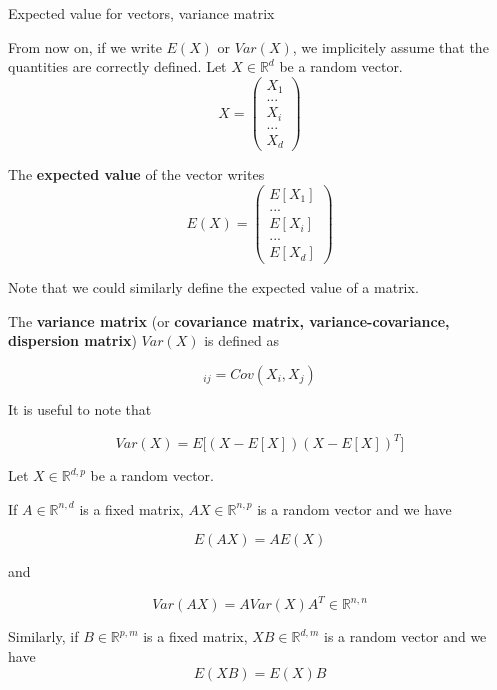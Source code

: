 \documentclass[
10pt, %
a4paper, %
oneside, %
headinclude,footinclude, %
BCOR5mm, %
]{scrartcl}
\begin{document}
\begin{definition}{Expected value for vectors, variance matrix}

    From now on, if we write $E(X)$ or $Var(X)$, we implicitely assume that the quantities are correctly defined. Let $X\in \mathbb{R}^d$ be a random vector.
\begin{equation*}
X=\begin{pmatrix}
X_{1}\\
...\\
X_{i}\\
...\\
X_{d}
\end{pmatrix}
\end{equation*}

The \textbf{{expected value}} of the vector writes
\begin{equation*}
    E(X)=\begin{pmatrix}
    E[X_{1}]\\
...\\
    E[X_{i}]\\
...\\
    E[X_{d}]
\end{pmatrix}
\end{equation*}

Note that we could similarly define the expected value of a matrix.

    The \textbf{{variance matrix}} (or \textbf{{covariance matrix, variance-covariance, dispersion matrix}})  $Var(X)$ is defined as

    \begin{equation*}
	[Var(X)]_{ij} = Cov(X_i, X_j)       
    \end{equation*}
\end{definition}

\begin{remark}
    It is useful to note that

    \begin{equation}
	Var(X) = E\Big[ (X-E[X])(X-E[X])^T\Big]
    \end{equation}
\end{remark}

\begin{lemma}
    Let $X \in \mathbb{R}^{d, p}$ be a random vector.

    If $A\in \mathbb{R}^{n,d}$ is a fixed matrix, $AX\in \mathbb{R}^{n,p}$ is a random vector and we have

    \begin{equation*}
	E(AX)=AE(X)
    \end{equation*}

    and 

        \begin{equation*}
	Var(AX) = AVar(X)A^T\in \mathbb{R}^{n, n}
    \end{equation*}
    
    Similarly, if $B\in \mathbb{R}^{p, m}$ is a fixed matrix, $XB \in \mathbb{R}^{d, m}$ is a random vector and we have
    \begin{equation*}
	E(XB)=E(X)B
    \end{equation*}
\end{lemma}
\end{document}
